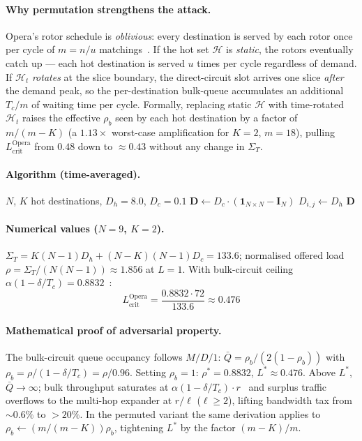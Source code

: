 \documentclass{article}
\begin{document}
    \paragraph{Why permutation strengthens the attack.}  Opera's rotor schedule is \emph{oblivious}: every destination is served by each rotor once per cycle of $m = n/u$ matchings~\cite{opera}.  If the hot set $\mathcal{H}$ is \emph{static}, the rotors eventually catch up --- each hot destination is served $u$ times per cycle regardless of demand.  If $\mathcal{H}_t$ \emph{rotates} at the slice boundary, the direct-circuit slot arrives one slice \emph{after} the demand peak, so the per-destination bulk-queue accumulates an additional $T_c/m$ of waiting time per cycle.  Formally, replacing static $\mathcal{H}$ with time-rotated $\mathcal{H}_t$ raises the effective $\rho_b$ seen by each hot destination by a factor of $m/(m{-}K)$ (a $1.13\times$ worst-case amplification for $K=2$, $m=18$), pulling $L_{\text{crit}}^{\text{Opera}}$ from $0.48$ down to $\approx 0.43$ without any change in $\Sigma_T$.

    \paragraph{Algorithm (time-averaged).}
    \begin{algorithmic}[1]
        \Require $N$, $K$ hot destinations, $D_h=8.0$, $D_c=0.1$
        \State $\mathbf{D} \gets D_c \cdot (\mathbf{1}_{N \times N} - \mathbf{I}_N)$
                    $D_{i,j} \gets D_h$
                \EndIf
            \EndFor
        \EndFor
        \State \Return $\mathbf{D}$
    \end{algorithmic}

    \paragraph{Numerical values ($N=9$, $K=2$).}  $\Sigma_T = K(N{-}1) D_h + (N{-}K)(N{-}1) D_c = 133.6$; normalised offered load $\rho = \Sigma_T/(N(N{-}1)) \approx 1.856$ at $L=1$.  With bulk-circuit ceiling $\alpha(1{-}\delta/T_c) = 0.8832$~\cite{opera}:
    \[
        L_{\text{crit}}^{\text{Opera}} = \frac{0.8832 \cdot 72}{133.6} \approx 0.476
    \]

    \paragraph{Mathematical proof of adversarial property.}  The bulk-circuit queue occupancy follows $M/D/1$: $\bar{Q} = \rho_b / (2(1{-}\rho_b))$ with $\rho_b = \rho/(1{-}\delta/T_c) = \rho/0.96$.  Setting $\rho_b = 1$: $\rho^* = 0.8832$, $L^* \approx 0.476$.  Above $L^*$, $\bar{Q}\to\infty$; bulk throughput saturates at $\alpha(1{-}\delta/T_c)\cdot r$~\cite{opera} and surplus traffic overflows to the multi-hop expander at $r/\ell$ ($\ell\ge2$), lifting bandwidth tax from ${\sim}0.6\%$ to $>20\%$.  In the permuted variant the same derivation applies to $\rho_b \gets (m/(m{-}K))\rho_b$, tightening $L^*$ by the factor $(m{-}K)/m$.
\end{document}
